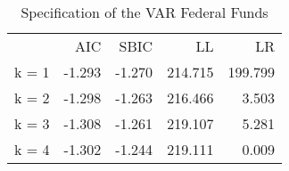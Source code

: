 \begin{table}[!h]
\caption{Specification of the VAR Federal Funds}
\centering
\begin{tabular}{lllll}
\cline{1-5}
\multicolumn{1}{c}{} &
  \multicolumn{1}{|r}{AIC} &
  \multicolumn{1}{r}{SBIC} &
  \multicolumn{1}{r}{LL} &
  \multicolumn{1}{r}{LR} \\
\cline{1-5}
\multicolumn{1}{l}{k = 1} &
  \multicolumn{1}{|r}{-1.293} &
  \multicolumn{1}{r}{-1.270} &
  \multicolumn{1}{r}{214.715} &
  \multicolumn{1}{r}{199.799} \\
\multicolumn{1}{l}{k = 2} &
  \multicolumn{1}{|r}{-1.298} &
  \multicolumn{1}{r}{-1.263} &
  \multicolumn{1}{r}{216.466} &
  \multicolumn{1}{r}{3.503} \\
\multicolumn{1}{l}{k = 3} &
  \multicolumn{1}{|r}{-1.308} &
  \multicolumn{1}{r}{-1.261} &
  \multicolumn{1}{r}{219.107} &
  \multicolumn{1}{r}{5.281} \\
\multicolumn{1}{l}{k = 4} &
  \multicolumn{1}{|r}{-1.302} &
  \multicolumn{1}{r}{-1.244} &
  \multicolumn{1}{r}{219.111} &
  \multicolumn{1}{r}{0.009} \\
\cline{1-5}
\end{tabular}
\end{table}
